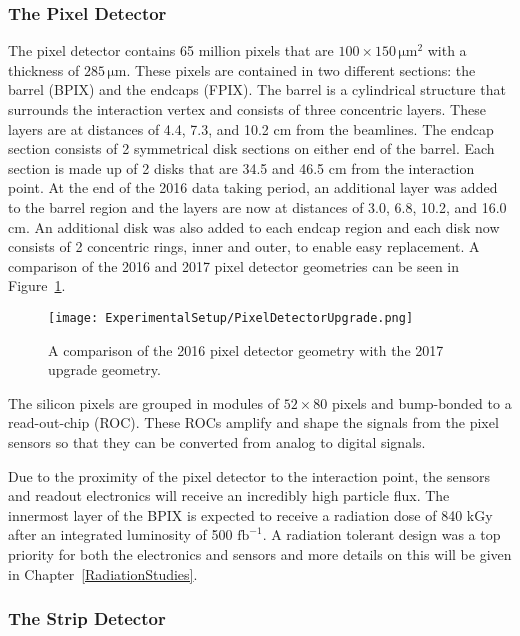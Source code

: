 \subsubsection{The Pixel Detector}
The pixel detector contains 65 million pixels that are $100 \times 150\,\mathrm{\mu m}^2$ with a thickness of $285\,\mathrm{\mu m}$. These pixels are contained in two different sections: the barrel (BPIX) and the endcaps (FPIX). The barrel is a cylindrical structure that surrounds the interaction vertex and consists of three concentric layers. These layers are at distances of 4.4, 7.3, and 10.2 cm from the beamlines. The endcap section consists of 2 symmetrical disk sections on either end of the barrel. Each section is made up of 2 disks that are 34.5 and 46.5 cm from the interaction point. At the end of the 2016 data taking period, an additional layer was added to the barrel region and the layers are now at distances of 3.0, 6.8, 10.2, and 16.0 cm. An additional disk was also added to each endcap region and each disk now consists of 2 concentric rings, inner and outer, to enable easy replacement.  A comparison of the 2016 and 2017 pixel detector geometries can be seen in Figure~\ref{fig:PixelUpgrade}\cite{CMSTracker}. 

\begin{figure}[htbp]
\texttt{[image: ExperimentalSetup/PixelDetectorUpgrade.png]}
\caption{A comparison of the 2016 pixel detector geometry with the 2017 upgrade geometry.}
\label{fig:PixelUpgrade}
\end{figure}

The silicon pixels are grouped in modules of $52 \times 80$ pixels and bump-bonded to a read-out-chip (ROC). These ROCs amplify and shape the signals from the pixel sensors so that they can be converted from analog to digital signals.  

Due to the proximity of the pixel detector to the interaction point, the sensors and readout electronics will receive an incredibly high particle flux. The 
innermost layer of the BPIX is expected to receive a radiation dose of 840 kGy after an integrated luminosity of 500 $\mathrm{fb}^{-1}$.  A radiation tolerant design was a top priority for both the electronics and sensors and more details on this will be given in Chapter~\ref{RadiationStudies}.


\subsubsection{The Strip Detector}


